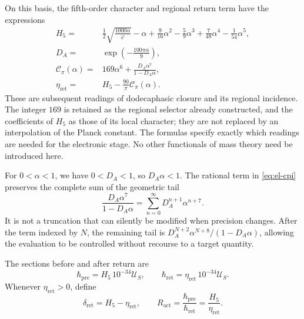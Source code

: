 On this basis, the fifth-order character and regional return term
have the expressions
\begin{align}
 H_5={}&\frac12\sqrt{\frac{1000\alpha}{\varphi}}-\alpha
   +\frac9{16}\alpha^2-\frac59\alpha^3
   +\frac7{48}\alpha^4-\frac1{54}\alpha^5,
   \label{eq:el-h5}\\
 D_A={}&\exp\!\left(-\frac{100\pi\alpha}{9}\right),
   \label{eq:el-da}\\
 \mathcal C_\pi(\alpha)={}&169\alpha^6+
       \frac{D_A\alpha^7}{1-D_A\alpha},
   \label{eq:el-cpi}\\
 \eta_{\mathrm{ret}}={}&H_5-\frac{90}{\pi}\mathcal C_\pi(\alpha).
   \label{eq:el-eta}
\end{align}
These are subsequent readings of dodecaphasic closure and its
regional incidence. The integer \(169\) is retained as the regional
selector already constructed, and the coefficients of \(H_5\) as those of its
local character; they are not replaced by an interpolation of the Planck
constant. The formulas specify exactly which readings are needed
for the electronic stage. No other functionals of mass theory need
be introduced here.

For \(0<\alpha<1\), we have \(0<D_A<1\), so
\(D_A\alpha<1\). The rational term in \eqref{eq:el-cpi} preserves the
complete sum of the geometric tail
\begin{equation}
 \frac{D_A\alpha^7}{1-D_A\alpha}
 =\sum_{n=0}^{\infty}D_A^{n+1}\alpha^{n+7}.
 \label{eq:el-cola-regional}
\end{equation}
It is not a truncation that can silently be modified when precision
changes. After the term indexed by \(N\), the remaining tail is
\(D_A^{N+2}\alpha^{N+8}/(1-D_A\alpha)\), allowing the evaluation
to be controlled without recourse to a target quantity.

\begin{definition}
The sections before and after return are
\begin{equation}
 \hbar_{\mathrm{pre}}=H_5\,10^{-34}\mathcal U_S,
 \qquad
 \hbar_{\mathrm{ret}}=\eta_{\mathrm{ret}}\,10^{-34}\mathcal U_S.
 \label{eq:el-secciones-accion}
\end{equation}
Whenever \(\eta_{\mathrm{ret}}>0\), define
\begin{equation}
 \delta_{\mathrm{ret}}=H_5-\eta_{\mathrm{ret}},\qquad
 R_{\mathrm{act}}=\frac{\hbar_{\mathrm{pre}}}{\hbar_{\mathrm{ret}}}
 =\frac{H_5}{\eta_{\mathrm{ret}}}.
 \label{eq:el-ratio}
\end{equation}
\end{definition}


